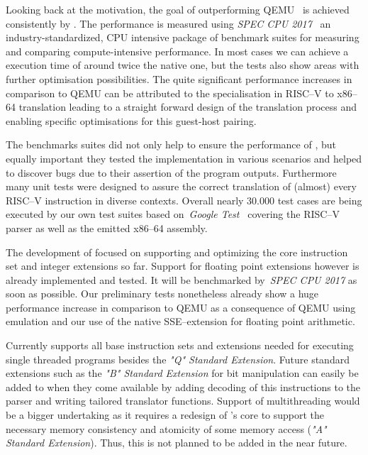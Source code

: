 Looking back at the motivation, the goal of outperforming QEMU~\cite{bellard2005qemu} is achieved consistently by \translatorname{}.
The performance is measured using \textit{SPEC CPU 2017}~\cite{spec-cpu-2017} an industry-standardized, CPU intensive package of benchmark suites for measuring and comparing compute-intensive performance.
In most cases we can achieve a execution time of around twice the native one, but the tests also show areas with further optimisation possibilities.
The quite significant performance increases in comparison to QEMU can be attributed to the specialisation in RISC--V to x86--64 translation leading to a straight forward design of the translation process and enabling specific optimisations for this guest-host pairing.

The benchmarks suites did not only help to ensure the performance of \translatorname{}, but equally important they tested the implementation in various scenarios and helped to discover bugs due to their assertion of the program outputs.
Furthermore many unit tests were designed to assure the correct translation of (almost) every RISC--V instruction in diverse contexts.
Overall nearly 30.000 test cases are being executed by our own test suites based on~\textit{Google Test}~\cite{gtest} covering the RISC--V parser as well as the emitted x86--64 assembly.

The development of \translatorname{} focused on supporting and optimizing the core instruction set and integer extensions so far.
Support for floating point extensions however is already implemented and tested.
It will be benchmarked by~\textit{SPEC CPU 2017} as soon as possible.
Our preliminary tests nonetheless already show a huge performance increase in comparison to QEMU as a consequence of QEMU using emulation and our use of the native SSE--extension for floating point arithmetic.


Currently \translatorname{} supports all base instruction sets and extensions needed for executing single threaded programs besides the \textit{"Q" Standard Extension}.
Future standard extensions such as the \textit{"B" Standard Extension} for bit manipulation can easily be added to \translatorname{} when they come available by adding decoding of this instructions to the parser and writing tailored translator functions.
Support of multithreading would be a bigger undertaking as it requires a redesign of \translatorname{}'s core to support the necessary memory consistency and atomicity of some memory access (\textit{"A" Standard Extension}).
Thus, this is not planned to be added in the near future.

